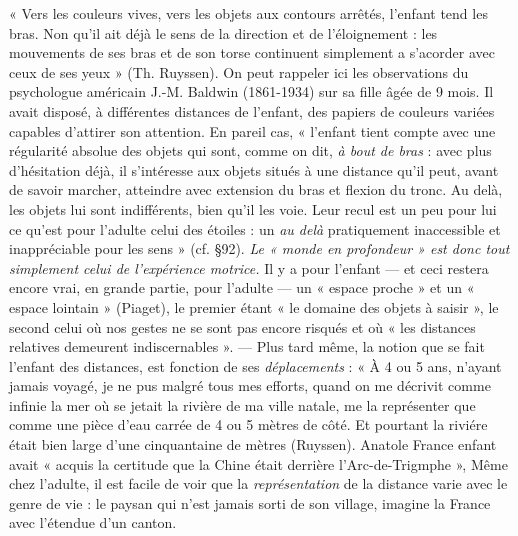 \vspace{0.24cm}
{\footnotesize « Vers les couleurs vives, vers les objets aux contours arrêtés,
l'enfant
tend les bras. Non qu'il ait déjà le sens de la direction et de l'éloignement :
les mouvements de ses bras et de son torse continuent simplement a s'acorder
avec ceux de ses yeux » (Th. Ruyssen). On peut rappeler ici les observations
du psychologue américain J.-M. Baldwin (1861-1934) sur sa fille
âgée de 9 mois. Il avait disposé, à différentes distances de l'enfant, des
papiers de couleurs variées capables d'attirer son attention. En pareil cas,
« l'enfant tient compte avec une régularité absolue des objets qui sont,
comme on dit, {\it à bout de bras} : avec plus d’hésitation déjà, il s'intéresse
aux objets situés à une distance qu'il peut, avant de savoir marcher,
atteindre avec extension du bras et flexion du tronc. Au delà, les objets
lui sont indifférents, bien qu’il les voie. Leur recul est un peu pour lui ce
qu'est pour l’adulte celui des étoiles : un {\it au delà} pratiquement inaccessible
et inappréciable pour les sens » (cf. \S 92). \textsf{\textit {Le « monde en profondeur » est donc
tout simplement celui de l'expérience motrice.}} Il y a pour l'enfant — et ceci
restera encore vrai, en grande partie, pour l'adulte — un « espace proche »
et un « espace lointain » (Piaget), le premier étant « le domaine des objets
à saisir », le second celui où nos gestes ne se sont pas encore risqués et où
« les distances relatives demeurent indiscernables ». — Plus tard même, la
notion que se fait l’enfant des distances, est fonction de ses {\it déplacements} :
« À 4 ou 5 ans, n'ayant jamais voyagé, je ne pus malgré tous mes efforts,
quand on me décrivit comme infinie la mer où se jetait la rivière de ma ville
natale, me la représenter que comme une pièce d’eau carrée de 4 ou 5 mètres
de côté. Et pourtant la riviére était bien large d’une cinquantaine de
mètres (Ruyssen). Anatole France enfant avait « acquis la certitude
que la Chine était derrière l'Arc-de-Trigmphe », Même chez l’adulte, il est
facile de voir que la {\it représentation} de la distance varie avec le genre de vie :
le paysan qui n’est jamais sorti de son village, imagine la France avec
l'étendue d’un canton.

}
